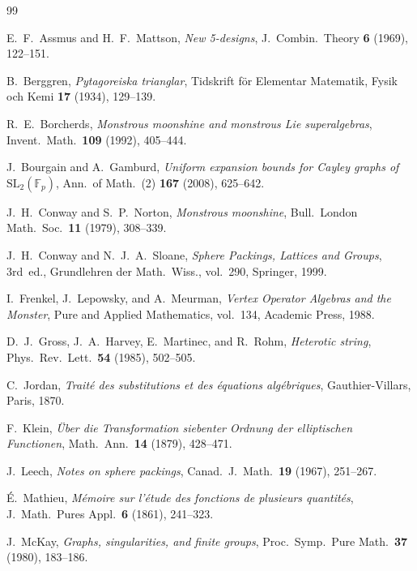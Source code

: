 \documentclass[12pt]{amsart}
\theoremstyle{definition}
\theoremstyle{remark}
\newcommand{\SL}{\mathrm{SL}}
\newcommand{\Fp}{\mathbb{F}_p}
\begin{document}
\begin{thebibliography}{99}

E.~F.~Assmus and H.~F.~Mattson,
\emph{New 5-designs},
J.\ Combin.\ Theory \textbf{6} (1969), 122--151.

B.~Berggren,
\emph{Pytagoreiska trianglar},
Tidskrift f\"or Elementar Matematik, Fysik och Kemi \textbf{17} (1934),
129--139.

R.~E.~Borcherds,
\emph{Monstrous moonshine and monstrous Lie superalgebras},
Invent.\ Math.\ \textbf{109} (1992), 405--444.

J.~Bourgain and A.~Gamburd,
\emph{Uniform expansion bounds for Cayley graphs of $\SL_2(\Fp)$},
Ann.\ of Math.\ (2) \textbf{167} (2008), 625--642.

J.~H.~Conway and S.~P.~Norton,
\emph{Monstrous moonshine},
Bull.\ London Math.\ Soc.\ \textbf{11} (1979), 308--339.

J.~H.~Conway and N.~J.~A.~Sloane,
\emph{Sphere Packings, Lattices and Groups},
3rd~ed., Grundlehren der Math.\ Wiss., vol.~290, Springer, 1999.

I.~Frenkel, J.~Lepowsky, and A.~Meurman,
\emph{Vertex Operator Algebras and the Monster},
Pure and Applied Mathematics, vol.~134, Academic Press, 1988.

D.~J.~Gross, J.~A.~Harvey, E.~Martinec, and R.~Rohm,
\emph{Heterotic string},
Phys.\ Rev.\ Lett.\ \textbf{54} (1985), 502--505.

C.~Jordan,
\emph{Trait\'e des substitutions et des \'equations alg\'ebriques},
Gauthier-Villars, Paris, 1870.

F.~Klein,
\emph{\"Uber die Transformation siebenter Ordnung der elliptischen
Functionen},
Math.\ Ann.\ \textbf{14} (1879), 428--471.

J.~Leech,
\emph{Notes on sphere packings},
Canad.\ J.\ Math.\ \textbf{19} (1967), 251--267.

\'E.~Mathieu,
\emph{M\'emoire sur l'\'etude des fonctions de plusieurs quantit\'es},
J.\ Math.\ Pures Appl.\ \textbf{6} (1861), 241--323.

J.~McKay,
\emph{Graphs, singularities, and finite groups},
Proc.\ Symp.\ Pure Math.\ \textbf{37} (1980), 183--186.


\end{thebibliography}
\end{document}

